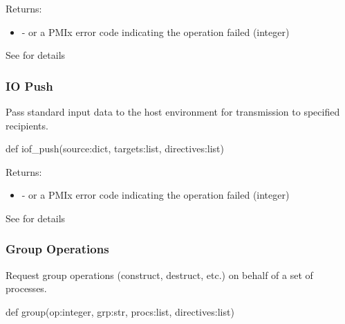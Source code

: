 Returns:
\begin{itemize}
    \item {} -  or a \ac{PMIx} error code indicating the operation failed (integer)
\end{itemize}

See  for details


\subsubsection{IO Push}

\summary

Pass standard input data to the host environment for transmission to specified recipients.

\format

\pyspecificstart
\begin{codepar}
def iof_push(source:dict, targets:list, directives:list)
\end{codepar}
\pyspecificend

\begin{arglist}
\end{arglist}

Returns:
\begin{itemize}
    \item {} -  or a \ac{PMIx} error code indicating the operation failed (integer)
\end{itemize}

See  for details


\subsubsection{Group Operations}

\summary

Request group operations (construct, destruct, etc.) on behalf of a set of processes.

\format

\pyspecificstart
\begin{codepar}
def group(op:integer, grp:str, procs:list, directives:list)
\end{codepar}
\pyspecificend

